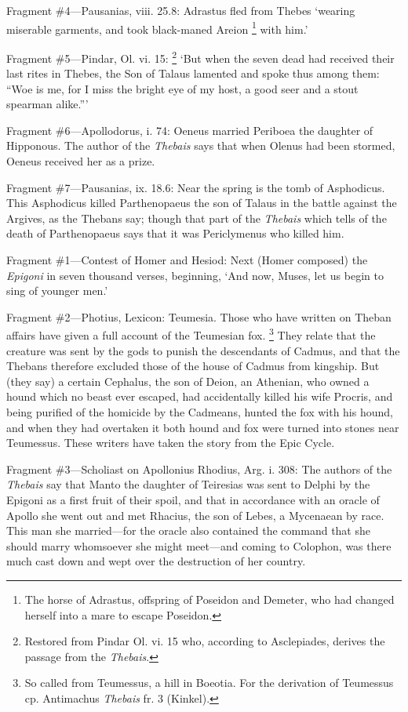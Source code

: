 Fragment \#4—Pausanias, viii. 25.8: Adrastus fled from Thebes
‘wearing miserable garments, and took black-maned Areion \footnote{The horse of Adrastus,
offspring of Poseidon and Demeter, who had changed herself into a mare to
escape Poseidon.} with him.’

Fragment \#5—Pindar, Ol. vi. 15: \footnote{Restored from Pindar Ol.
vi. 15 who, according to Asclepiades, derives the passage from the
\emph{Thebais}.}
‘But when the seven dead had received their last rites in Thebes, the Son
of Talaus lamented and spoke thus among them: “Woe is me, for I miss the
bright eye of my host, a good seer and a stout spearman alike.”’

Fragment \#6—Apollodorus, i. 74: Oeneus married Periboea the daughter of
Hipponous. The author of the \emph{Thebais} says that when Olenus had
been stormed, Oeneus received her as a prize.

Fragment \#7—Pausanias, ix. 18.6: Near the spring is the tomb of
Asphodicus. This Asphodicus killed Parthenopaeus the son of Talaus in the
battle against the Argives, as the Thebans say; though that part of the
\emph{Thebais} which tells of the death of Parthenopaeus says that it
was Periclymenus who killed him.


Fragment \#1—Contest of Homer and Hesiod: Next (Homer composed) the
\emph{Epigoni} in seven thousand verses, beginning, ‘And now,
Muses, let us begin to sing of younger men.’

Fragment \#2—Photius, Lexicon: Teumesia. Those who have written on Theban
affairs have given a full account of the Teumesian fox. \footnote{So called from Teumessus,
a hill in Boeotia. For the derivation of Teumessus cp. Antimachus
\emph{Thebais} fr. 3 (Kinkel).} They relate that the creature was
sent by the gods to punish the descendants of Cadmus, and that the Thebans
therefore excluded those of the house of Cadmus from kingship. But (they say) a
certain Cephalus, the son of Deion, an Athenian, who owned a hound which no
beast ever escaped, had accidentally killed his wife Procris, and being
purified of the homicide by the Cadmeans, hunted the fox with his hound, and
when they had overtaken it both hound and fox were turned into stones near
Teumessus. These writers have taken the story from the Epic Cycle.

Fragment \#3—Scholiast on Apollonius Rhodius, Arg. i. 308: The authors of
the \emph{Thebais} say that Manto the daughter of Teiresias was sent to
Delphi by the Epigoni as a first fruit of their spoil, and that in accordance
with an oracle of Apollo she went out and met Rhacius, the son of Lebes, a
Mycenaean by race. This man she married—for the oracle also contained the
command that she should marry whomsoever she might meet—and coming to
Colophon, was there much cast down and wept over the destruction of her
country.

